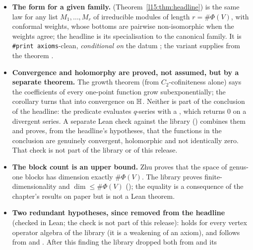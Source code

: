 \begin{itemize}
  semisimple'' was unproved. Both claims were wrong, and so were the matching module docstrings
  (\texttt{RELEASE\_AUDIT\_NEW\_DECLS.md}, F2). The docstrings have since been corrected.
\item \textbf{The form for a given family.} \allowbreak{}\allowbreak{}
  (Theorem~\ref{l15:thm:headline}) is the same law for any list $M_1,\dots,M_r$ of irreducible modules of length
  $r=\#\Phi(V)$, with conformal weights, whose bottoms are pairwise non-isomorphic when the weights agree; the headline is
  its specialisation to the canonical family. It is \texttt{\#print axioms}-clean, \emph{conditional on} the datum
  ; the variant
  \allowbreak{}\allowbreak{} supplies  from the theorem
  .
\item \textbf{Convergence and holomorphy are proved, not assumed, but by a separate theorem.} The growth theorem
   (from $C_2$-cofiniteness alone) says the coefficients of every one-point function grow
  subexponentially; the corollary  turns that into convergence on $\mathbb{H}$. Neither
  is part of the conclusion of the headline: the predicate  evaluates $q$-series with a
  , which returns $0$ on a divergent series. A separate
  Lean check against the library
  (\allowbreak{}) combines them and proves, from the headline's hypotheses, that the
  functions in the conclusion are genuinely convergent, holomorphic and not identically zero. That check is not part of
  the library or of this release.
\item \textbf{The block count is an upper bound.} Zhu proves that the space of genus-one blocks has dimension exactly
  $\#\Phi(V)$. The library proves finite-dimensionality and $\dim\le\#\Phi(V)$
  (\allowbreak{}\allowbreak{}\allowbreak{}); the equality is a
  consequence of the chapter's results on paper but is not a Lean theorem.
\item \textbf{Two redundant hypotheses, since removed from the headline} (checked in Lean; the check is not part of this release): 
  holds for every vertex operator algebra of the library (it is a weakening of an axiom), and  follows from
   and . After this finding the library dropped both from  and its

\end{itemize}
